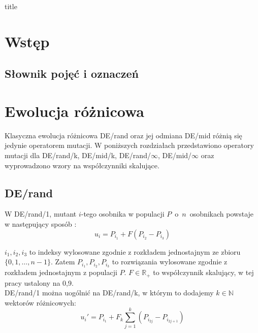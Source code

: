 \documentclass[a4paper,onecolumn,oneside,11pt,wide,floatssmall]{mwrep}
\theoremstyle{definition}
\theoremstyle{plain}%
\theoremstyle{remark}
\begin{document}
\renewcommand*\lstlistingname{Wydruk}
\renewcommand*\lstlistlistingname{Spis wydruków}

\renewcommand{\baselinestretch}{1.0}
\raggedbottom
 {title}

\tableofcontents

\newpage
{}
\setcounter{page}{1}

\chapter{Wstęp}

\section{Słownik pojęć i oznaczeń}

\chapter{Ewolucja różnicowa}

Klasyczna ewolucja różnicowa DE/rand oraz jej odmiana DE/mid różnią się jedynie operatorem mutacji.
W poniższych rozdziałach przedstawiono operatory mutacji dla DE/rand/k, DE/mid/k, DE/rand/$\infty$, DE/mid/$\infty$
oraz wyprowadzono wzory na współczynniki skalujące.

\section{DE/rand}

W DE/rand/1, mutant $i$-tego osobnika w populacji $P$~o~$n$~osobnikach powstaje w następujący sposób \cite{decomposition}:
\begin{equation} \label{eq:derand1}
u_i = P_{i_1} + F(P_{i_2} - P_{i_3})
\end{equation}

$i_1, i_2, i_3$ to indeksy wylosowane zgodnie z rozkładem jednostajnym ze zbioru \\ 
$\{0, 1, \dots, n-1\}$. Zatem $P_{i_1}, P_{i_2}, P_{i_3}$ to rozwiązania wylosowane zgodnie z rozkładem jednostajnym z populacji $P$.
$F\in\mathbb{R_+}$ to współczynnik skalujący, w tej pracy ustalony na 0,9. \\

DE/rand/1 można uogólnić na DE/rand/k, w którym to dodajemy
$k \in \mathbb{N}$ wektorów różnicowych:
\begin{equation} \label{eq:derand}
u_i' = P_{i_1} + F_k\sum\limits_{j=1}^k (P_{i_{2j}} - P_{i_{2j+1}})
\end{equation}
\end{document}
